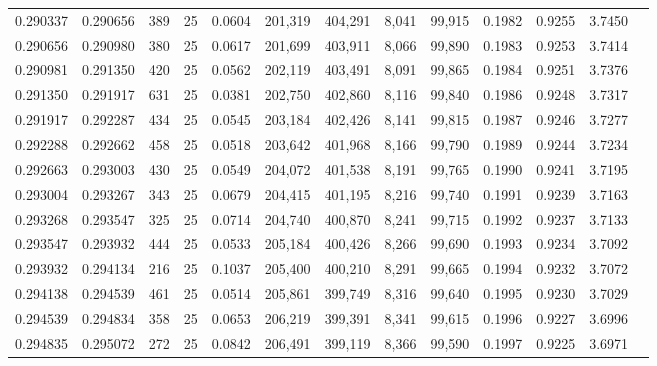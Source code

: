 \begin{tabular}{rrrrrrrrrrrrr}
0.290337 & 0.290656 &   389 &  25 &                                     0.0604 & 201,319 & 404,291 &   8,041 &  99,915 & 0.1982 & 0.9255 & 3.7450 \\
0.290656 & 0.290980 &   380 &  25 &                                     0.0617 & 201,699 & 403,911 &   8,066 &  99,890 & 0.1983 & 0.9253 & 3.7414 \\
0.290981 & 0.291350 &   420 &  25 &                                     0.0562 & 202,119 & 403,491 &   8,091 &  99,865 & 0.1984 & 0.9251 & 3.7376 \\
0.291350 & 0.291917 &   631 &  25 &                                     0.0381 & 202,750 & 402,860 &   8,116 &  99,840 & 0.1986 & 0.9248 & 3.7317 \\
0.291917 & 0.292287 &   434 &  25 &                                     0.0545 & 203,184 & 402,426 &   8,141 &  99,815 & 0.1987 & 0.9246 & 3.7277 \\
0.292288 & 0.292662 &   458 &  25 &                                     0.0518 & 203,642 & 401,968 &   8,166 &  99,790 & 0.1989 & 0.9244 & 3.7234 \\
0.292663 & 0.293003 &   430 &  25 &                                     0.0549 & 204,072 & 401,538 &   8,191 &  99,765 & 0.1990 & 0.9241 & 3.7195 \\
0.293004 & 0.293267 &   343 &  25 &                                     0.0679 & 204,415 & 401,195 &   8,216 &  99,740 & 0.1991 & 0.9239 & 3.7163 \\
0.293268 & 0.293547 &   325 &  25 &                                     0.0714 & 204,740 & 400,870 &   8,241 &  99,715 & 0.1992 & 0.9237 & 3.7133 \\
0.293547 & 0.293932 &   444 &  25 &                                     0.0533 & 205,184 & 400,426 &   8,266 &  99,690 & 0.1993 & 0.9234 & 3.7092 \\
0.293932 & 0.294134 &   216 &  25 &                                     0.1037 & 205,400 & 400,210 &   8,291 &  99,665 & 0.1994 & 0.9232 & 3.7072 \\
0.294138 & 0.294539 &   461 &  25 &                                     0.0514 & 205,861 & 399,749 &   8,316 &  99,640 & 0.1995 & 0.9230 & 3.7029 \\
0.294539 & 0.294834 &   358 &  25 &                                     0.0653 & 206,219 & 399,391 &   8,341 &  99,615 & 0.1996 & 0.9227 & 3.6996 \\
0.294835 & 0.295072 &   272 &  25 &                                     0.0842 & 206,491 & 399,119 &   8,366 &  99,590 & 0.1997 & 0.9225 & 3.6971 \\

\end{tabular}

